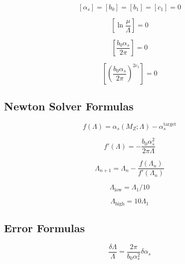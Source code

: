 \documentclass[11pt,a4paper]{article}
\theoremstyle{definition}
\begin{document}
\begin{equation}
\label{eq:cat-27}
[\alpha_s] = [b_0] = [b_1] = [c_1] = 0
\end{equation}

\begin{equation}
\label{eq:cat-28}
\left[\ln\frac{\mu}{\Lambda}\right] = 0
\end{equation}

\begin{equation}
\label{eq:cat-29}
\left[\frac{b_0\alpha_s}{2\pi}\right] = 0
\end{equation}

\begin{equation}
\label{eq:cat-30}
\left[\left(\frac{b_0\alpha_s}{2\pi}\right)^{2c_1}\right] = 0
\end{equation}

\subsection{Newton Solver Formulas}
\label{subsec:cat-newton}

\begin{equation}
\label{eq:cat-31}
f(\Lambda) = \alpha_s(M_Z; \Lambda) - \alpha_s^{\text{target}}
\end{equation}

\begin{equation}
\label{eq:cat-32}
f'(\Lambda) = -\frac{b_0\alpha_s^2}{2\pi\Lambda}
\end{equation}

\begin{equation}
\label{eq:cat-33}
\Lambda_{n+1} = \Lambda_n - \frac{f(\Lambda_n)}{f'(\Lambda_n)}
\end{equation}

\begin{equation}
\label{eq:cat-34}
\Lambda_{\text{low}} = \Lambda_1/10
\end{equation}

\begin{equation}
\label{eq:cat-35}
\Lambda_{\text{high}} = 10\Lambda_1
\end{equation}

\subsection{Error Formulas}
\label{subsec:cat-error}

\begin{equation}
\label{eq:cat-36}
\frac{\delta\Lambda}{\Lambda} = \frac{2\pi}{b_0\alpha_s^2}\delta\alpha_s
\end{equation}
\end{document}
